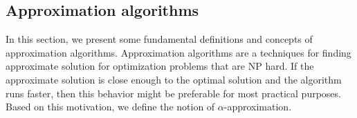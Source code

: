 % 
% 
% 

\subsection{Approximation algorithms}
In this section, we present some fundamental definitions and concepts of approximation algorithms.
Approximation algorithms are a techniques for finding approximate solution for optimization problems that are NP hard.
If the approximate solution is close enough to the optimal solution and the algorithm runs faster, then this behavior might be preferable for most practical purposes. 
Based on this motivation, we define the notion of $\alpha$-approximation.

